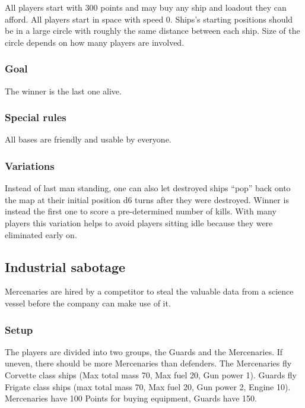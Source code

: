 \documentclass[a4paper,12pt,notitlepage,twocolumn]{article}
\begin{document}
All players start with 300 points and may buy any ship and loadout
they can afford. All players start in space with speed 0. Ships's
starting positions should be in a large circle with roughly the same distance between
each ship. Size of the circle depends on how many players are
involved. 

\subsubsection*{Goal}

The winner is the last one alive. 

\subsubsection*{Special rules}

All bases are friendly and usable by everyone. 

\subsubsection*{Variations}

Instead of last man standing, one can also let destroyed ships ``pop''
back onto the map at their initial position d6 turns after they were
destroyed. Winner is instead the first one to score a pre-determined number of
kills. With many players this variation helps to avoid players sitting idle 
because they were eliminated early on. 

\subsection{Industrial sabotage}

Mercenaries are hired by a competitor to steal the valuable data from a
science vessel before the company can make use of it.

\subsubsection*{Setup}

The players are divided into two groups, the Guards and the
Mercenaries. If uneven, there should be more Mercenaries than
defenders. The Mercenaries fly Corvette class ships (Max total
mass 70, Max fuel 20, Gun power 1). Guards fly Frigate class ships (max total mass 70, Max
fuel 20, Gun power 2, Engine 10). Mercenaries have 100 Points for
buying equipment, Guards have 150. 
\end{document}
